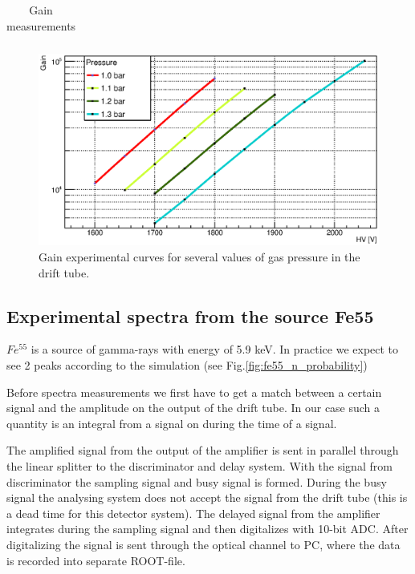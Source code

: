 \documentclass[12pt,a4paper]{article}
\begin{document}
\begin{table}[!h]
\begin{tabular}{|l|l|l|l|l|l|l|}
	\end{tabular}
	\caption{Gain measurements}
	\label{table:GainTotal}
	\end{table}
	
	\begin{figure}[!h]
	\centering
	\includegraphics[width=1.0\textwidth]{gain_multyGraph}
	\caption{Gain experimental curves for several values of gas pressure in the drift tube.}
	\label{fig:Gain_multy}
	\end{figure}
		
	
	\subsection{Experimental spectra from the source Fe55}
		
	$Fe^{55}$  is a source of gamma-rays with energy of 5.9 keV. In practice we expect to see 2 peaks according to the simulation (see Fig.\ref{fig:fe55_n_probability})

	Before spectra measurements we first have to get a match between a certain signal and the amplitude on the output of the drift tube. In our case such a quantity is an integral from a signal on during the time of a signal.
	
	The amplified signal from the output of the amplifier is sent in parallel through the linear splitter to the discriminator and delay system. With the signal from discriminator the sampling signal and busy signal is formed. During the busy signal the analysing system does not accept the signal from the drift tube (this is a dead time for this detector system). The delayed signal from the amplifier integrates during the sampling signal and then digitalizes with 10-bit ADC. After digitalizing the signal is sent through the optical channel to PC, where the data is recorded into separate ROOT-file.
	
\end{document}
